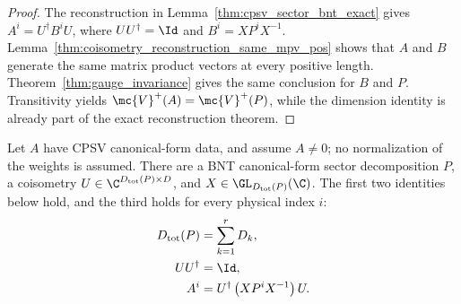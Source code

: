 \begin{proof}\leanok
    The reconstruction in Lemma~\ref{thm:cpsv_sector_bnt_exact}
    gives $A^i=U^\dagger B^iU$, where $UU^\dagger=\Id$ and
    $B^i=XP^iX^{-1}$. Lemma~\ref{thm:coisometry_reconstruction_same_mpv_pos}
    shows that $A$ and $B$ generate the same matrix product vectors at every
    positive length. Theorem~\ref{thm:gauge_invariance} gives the same conclusion
    for $B$ and $P$. Transitivity yields $\mc{V}^+(A)=\mc{V}^+(P)$, while the
    dimension identity is already part of the exact reconstruction theorem.
\end{proof}

\begin{lemma}%
    \label{thm:cpsv_sector_bnt_exact}
    \leanok
    Let $A$ have CPSV canonical-form data, and assume $A\ne0$; no
    normalization of the weights is assumed. There
    are a BNT canonical-form sector decomposition $P$, a coisometry
    $U\in\C^{D_{\mathrm{tot}}(P)\times D}$, and
    $X\in\GL_{D_{\mathrm{tot}}(P)}(\C)$. The first two identities below hold,
    and the third holds for every physical index $i$:
    \begin{align}
        D_{\mathrm{tot}}(P)
                   & =\sum_{k=1}^{r}D_k,
        \label{eq:cpsv_active_exact_bnt_dim}             \\
        UU^\dagger & =\Id,
        \label{eq:cpsv_active_exact_bnt_coisometry}      \\
        A^i        & =U^\dagger\left(XP^iX^{-1}\right)U.
        \label{eq:cpsv_active_exact_bnt_reconstruction}
    \end{align}
\end{lemma}

